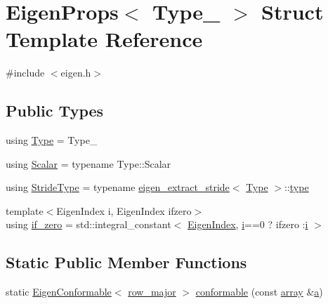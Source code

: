 \hypertarget{struct_eigen_props}{}\section{Eigen\+Props$<$ Type\+\_\+ $>$ Struct Template Reference}
\label{struct_eigen_props}


{\ttfamily \#include $<$eigen.\+h$>$}

\subsection*{Public Types}
\begin{DoxyCompactItemize}
\item 
using \mbox{\hyperlink{struct_eigen_props_ababed0b6298eeb5f4ded06da92c96cd7}{Type}} = Type\+\_\+
\item 
using \mbox{\hyperlink{struct_eigen_props_ae36317e24288de2c7b47017ce58acc37}{Scalar}} = typename Type\+::\+Scalar
\item 
using \mbox{\hyperlink{struct_eigen_props_a21dcc2d713c484e7a84e679c793e8fea}{Stride\+Type}} = typename \mbox{\hyperlink{structeigen__extract__stride}{eigen\+\_\+extract\+\_\+stride}}$<$ \mbox{\hyperlink{struct_eigen_props_ababed0b6298eeb5f4ded06da92c96cd7}{Type}} $>$\+::\mbox{\hyperlink{_s_d_l__opengl_8h_ad5ddf6fca7b585646515660e810e0188}{type}}
\item 
{\footnotesize template$<$Eigen\+Index i, Eigen\+Index ifzero$>$ }\\using \mbox{\hyperlink{struct_eigen_props_aa728072a2702217ee987bf9ab3b9d07d}{if\+\_\+zero}} = std\+::integral\+\_\+constant$<$ \mbox{\hyperlink{eigen_8h_a4e595ab182718d84a409dd05e0829bdd}{Eigen\+Index}}, \mbox{\hyperlink{abstract_8h_a13235ab5ddf5c2ccd5ca35ab01d91328}{i}}==0 ? ifzero \+:\mbox{\hyperlink{abstract_8h_a13235ab5ddf5c2ccd5ca35ab01d91328}{i}} $>$
\end{DoxyCompactItemize}
\subsection*{Static Public Member Functions}
\begin{DoxyCompactItemize}
\item 
static \mbox{\hyperlink{struct_eigen_conformable}{Eigen\+Conformable}}$<$ \mbox{\hyperlink{struct_eigen_props_a290ebf6baed2dca134f928c13dda4030}{row\+\_\+major}} $>$ \mbox{\hyperlink{struct_eigen_props_a370b3557e63a8619c290a0dd36523a14}{conformable}} (const \mbox{\hyperlink{classarray}{array}} \&\mbox{\hyperlink{_s_d_l__opengl__glext_8h_a3309789fc188587d666cda5ece79cf82}{a}})
\end{DoxyCompactItemize}
